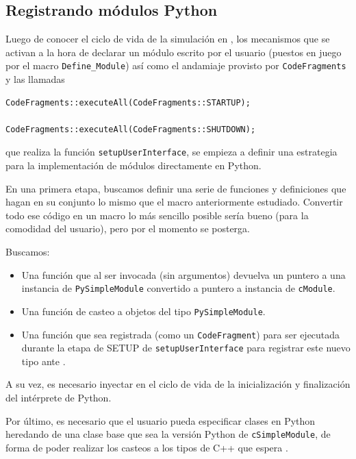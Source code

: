 \documentclass[]{article}
\begin{document}
\subsection{Registrando módulos Python}

Luego de conocer el ciclo de vida de la simulación en \omnetpp{}, los mecanismos
que se activan a la hora de declarar un módulo escrito por el usuario (puestos
en juego por el macro \verb!Define_Module!) así como el andamiaje provisto por
\verb!CodeFragments! y las llamadas

\begin{verbatim}
CodeFragments::executeAll(CodeFragments::STARTUP);

CodeFragments::executeAll(CodeFragments::SHUTDOWN);
\end{verbatim}

\noindent que realiza la función \verb!setupUserInterface!, se empieza a definir una
estrategia para la implementación de módulos directamente en Python.

En una primera etapa, buscamos definir una serie de funciones y definiciones
que hagan en su conjunto lo mismo que el macro anteriormente estudiado.
Convertir todo ese código en un macro lo más sencillo posible sería bueno (para
la comodidad del usuario), pero por el momento se posterga.

Buscamos:

\begin{itemize}
    \item Una función que al ser invocada (sin argumentos) devuelva un puntero
a una instancia de \verb!PySimpleModule! convertido a puntero a instancia de
\verb!cModule!.

    \item Una función de casteo a objetos del tipo \verb!PySimpleModule!.

    \item Una función que sea registrada (como un \verb!CodeFragment!) para ser
ejecutada durante la etapa de SETUP de \verb!setupUserInterface! para registrar
este nuevo tipo ante \omnetpp{}. 

\end{itemize}

A su vez, es necesario inyectar en el ciclo de vida de \omnetpp{} la
inicialización y finalización del intérprete de Python.

Por último, es necesario que el usuario pueda especificar clases en Python
heredando de una clase base que sea la versión Python de \verb!cSimpleModule!,
de forma de poder realizar los casteos a los tipos de C++ que espera \omnetpp{}.
\end{document}

